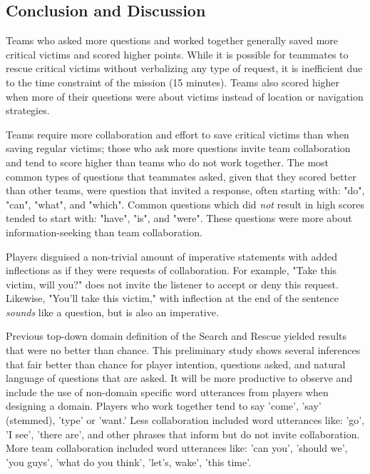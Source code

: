 \clearpage

\subsection{ Conclusion and Discussion}
Teams who asked more questions and worked together generally saved more critical victims and scored higher points. While it is possible for teammates to rescue critical victims without verbalizing any type of request, it is inefficient due to the time constraint of the mission (15 minutes). Teams also scored higher when more of their questions were about victims instead of location or navigation strategies.

Teams require more collaboration and effort to save critical victims than when saving regular victims; those who ask more questions invite team collaboration and tend to score higher than teams who do not work together. The most common types of questions that teammates asked, given that they scored better than other teams, were question that invited a response, often starting with: "do", "can", "what", and "which". Common questions which did \textit{not} result in high scores tended to start with: "have", "is", and "were". These questions were more about information-seeking than team collaboration.

Players disguised a non-trivial amount of imperative statements with added inflections as if they were requests of collaboration. For example, "Take this victim, will you?" does not invite the listener to accept or deny this request. Likewise, "You'll take this victim," with inflection at the end of the sentence \textit{sounds} like a question, but is also an imperative. 

Previous top-down domain definition of the Search and Rescue yielded results that were no better than chance. This preliminary study shows several inferences that fair better than chance for player intention, questions asked, and natural language of questions that are asked. It will be more productive to observe and include the use of non-domain specific word utterances from players when designing a domain. Players who work together tend to say 'come', 'say' (stemmed), 'type' or 'want.' Less collaboration included word utterances like: 'go', 'I see', 'there are', and other phrases that inform but do not invite collaboration. More team collaboration included word utterances like: 'can you', 'should we', 'you guys', 'what do you think', 'let's, wake', 'this time'. 

